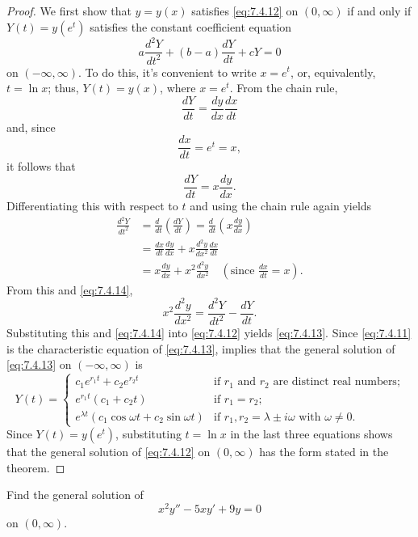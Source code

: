 \begin{proof}
We first show that $y=y(x)$ satisfies \eqref{eq:7.4.12} on
$(0,\infty)$ if and only if $Y(t)=y(e^t)$ satisfies the constant
coefficient equation
\begin{equation} \label{eq:7.4.13}
a\frac{d^2Y}{dt^2}+(b-a)\frac{dY}{dt}+cY=0
\end{equation} on
$(-\infty,\infty)$. To do this, it's convenient to write $x=e^t$, or,
equivalently, $t=\ln x$;   thus, $Y(t)=y(x)$, where $x=e^t$. From the
chain rule,
\[
\frac{dY}{dt}=\frac{dy}{dx}\frac{dx}{dt}
\]
and, since
\[
\frac{dx}{dt}=e^t=x,
\]
it follows that
\begin{equation} \label{eq:7.4.14}
\frac{dY}{dt}=x\frac{dy}{dx}.
\end{equation}
Differentiating this with
respect to $t$ and using the chain rule again yields
\begin{align*}
\frac{d^2Y}{dt^2}
&=\frac{d\phantom{t}}{dt}\left(\frac{dY}{dt}\right)=\frac{d\phantom{t}}{dt}\left(x\frac{dy}{dx}\right)\\
&=\frac{dx}{dt}\frac{dy}{dx}+x\frac{d^2y}{dx^2}\frac{dx}{dt}\\
&=x\frac{dy}{dx}+x^2\frac{d^2y}{dx^2}\quad\left(\text{since } \frac{dx}{dt}=x\right).
\end{align*}
From this and \eqref{eq:7.4.14},
\[
x^2\frac{d^2y}{dx^2}=\frac{d^2Y}{dt^2}-\frac{dY}{dt}.
\]
Substituting this and \eqref{eq:7.4.14} into \eqref{eq:7.4.12} yields
\eqref{eq:7.4.13}. Since \eqref{eq:7.4.11} is the characteristic equation of
\eqref{eq:7.4.13},  implies that the general solution
of \eqref{eq:7.4.13} on $(-\infty,\infty)$ is
\[
Y(t)=\begin{cases}
c_1e^{r_1t}+c_2e^{r_2t}&\text{if $r_1$ and $r_2$ are distinct real numbers;}\\
e^{r_1t}(c_1+c_2t)&\text{if $r_1=r_2$;}\\
e^{\lambda t }\left(c_1\cos\omega t+c_2\sin\omega t \right)
&\text{if $r_1,r_2=\lambda\pm i\omega$ with $\omega\ne0$}.
\end{cases}
\]
Since $Y(t)=y(e^t)$, substituting $t=\ln x$ in the last three
equations shows that the general solution of \eqref{eq:7.4.12} on
$(0,\infty)$ has the form stated in the theorem.
\end{proof}

\begin{example}\label{example:7.4.6}
 Find the general solution of
\begin{equation} \label{eq:7.4.15}
x^2y''-5xy'+9y=0
\end{equation}
on $(0,\infty)$.
\end{example}

